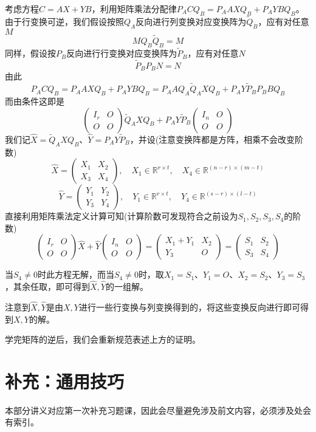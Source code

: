 \documentclass[a4paper,UTF8,fontset=windows]{ctexart}
\newcommand*{\note}{\noindent *}
\begin{document}
考虑方程$C=AX+YB$，利用矩阵乘法分配律$P_ACQ_B=P_AAXQ_B+P_AYBQ_B$。由于行变换可逆，我们假设按照$Q_A$反向进行列变换对应变换阵为$\tilde{Q}_B$，应有对任意$M$
$$MQ_B\tilde{Q}_B=M$$
同样，假设按$P_B$反向进行行变换对应变换阵为$\tilde{P}_B$，应有对任意$N$
$$\tilde{P}_BP_BN=N$$
由此
$$P_ACQ_B=P_AAXQ_B+P_AYBQ_B=P_AAQ_A\tilde{Q}_AXQ_B+P_AY\tilde{P}_BP_BBQ_B$$
而由条件这即是
$$\begin{pmatrix}I_r&O\\O&O\end{pmatrix}\tilde{Q}_AXQ_B+P_AY\tilde{P}_B\begin{pmatrix}I_n&O\\O&O\end{pmatrix}$$
我们记$\hat{X}=\tilde{Q}_AXQ_B$、$\hat{Y}=P_AY\tilde{P}_B$，并设(注意变换阵都是方阵，相乘不会改变阶数)
$$\hat{X}=\begin{pmatrix}X_1&X_2\\X_3&X_4\end{pmatrix},\quad X_1\in\mathbb{R}^{r\times t},\quad X_4\in\mathbb{R}^{(n-r)\times(m-t)}$$
$$\hat{Y}=\begin{pmatrix}Y_1&Y_2\\Y_3&Y_4\end{pmatrix},\quad Y_1\in\mathbb{R}^{r\times t},\quad Y_4\in\mathbb{R}^{(s-r)\times(l-t)}$$
直接利用矩阵乘法定义计算可知(计算阶数可发现符合之前设为$S_1,S_2,S_3,S_4$的阶数)
$$\begin{pmatrix}I_r&O\\O&O\end{pmatrix}\hat{X}+\hat{Y}\begin{pmatrix}I_n&O\\O&O\end{pmatrix}=\begin{pmatrix}X_1+Y_1&X_2\\Y_3&O\end{pmatrix}=\begin{pmatrix}S_1&S_2\\S_3&S_4\end{pmatrix}$$

当$S_4\ne0$时此方程无解，而当$S_4\ne 0$时，取$X_1=S_1$、$Y_1=O$、$X_2=S_2$、$Y_3=S_3$，其余任取，即可得到$\hat{X},\hat{Y}$的一组解。

注意到$\hat{X},\hat{Y}$是由$X,Y$进行一些行变换与列变换得到的，将这些变换反向进行即可得到$X,Y$的解。

\note 学完矩阵的逆后，我们会重新规范表述上方的证明。

\section{补充：通用技巧}
\note 本部分讲义对应第一次补充习题课，因此会尽量避免涉及前文内容，必须涉及处会有索引。
\end{document}
